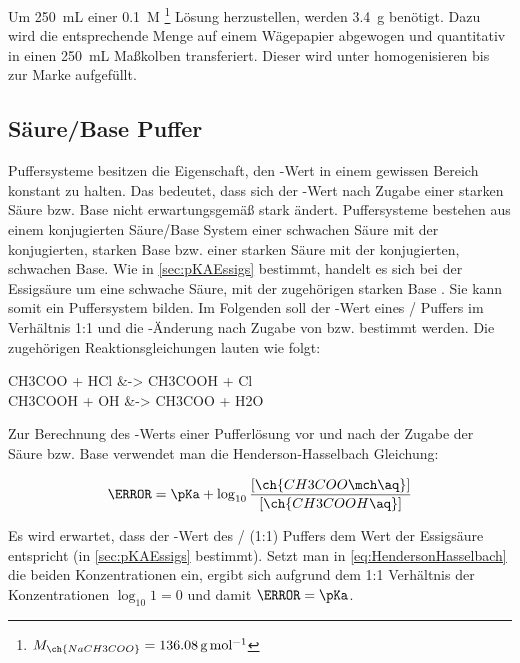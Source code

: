 \documentclass{article}
\begin{document}
         Um \SI[mode=text]{250}{\milli\liter} einer \SI[mode=text]{0.1}{M} \footnote{$M_{\ch{NaCH3COO}} = \SI[mode=text]{136.08}{\gram\per\mole}$} Lösung herzustellen, werden \SI[mode=text]{3.4}{\gram} benötigt. Dazu wird die entsprechende Menge auf einem Wägepapier abgewogen und quantitativ in einen \SI[mode=text]{250}{\milli\liter} Maßkolben transferiert. Dieser wird unter homogenisieren bis zur Marke aufgefüllt. 
    
    \pagebreak
    
    \subsection{Säure/Base Puffer} \label{sec:SauerBase}
    
      Puffersysteme besitzen die Eigenschaft, den \pH-Wert in einem gewissen Bereich konstant zu halten. Das bedeutet, dass sich der \pH-Wert nach Zugabe einer starken Säure bzw. Base nicht erwartungsgemäß stark ändert. Puffersysteme bestehen aus einem konjugierten Säure/Base System einer schwachen Säure mit der konjugierten, starken Base bzw. einer starken Säure mit der konjugierten, schwachen Base. Wie in \ref{sec:pKAEssigs} bestimmt, handelt es sich bei der Essigsäure um eine schwache Säure, mit der zugehörigen starken Base . Sie kann somit ein Puffersystem bilden. Im Folgenden soll der \pH-Wert eines / Puffers im Verhältnis 1:1 und die \pH-Änderung nach Zugabe von  bzw.  bestimmt werden. Die zugehörigen Reaktionsgleichungen lauten wie folgt:
      
      \begin{reactions}
        CH3COO\mch\aq{} + HCl\aq{} &-> CH3COOH\aq{} + Cl\mch\aq{} \label{rec:Protonenzugabe} \\
        CH3COOH\aq{} + OH\mch\aq{} &-> CH3COO\mch\aq{} + H2O 
      \end{reactions} 
      
      Zur Berechnung des \pH-Werts einer Pufferlösung vor und nach der Zugabe der Säure bzw. Base verwendet man die Henderson-Hasselbach Gleichung:
      
      \begin{equation}
        \pH = \pKa + \log _{10} \frac{[\ch{CH3COO\mch\aq}]}{[\ch{CH3COOH\aq}]} \label{eq:HendersonHasselbach}
      \end{equation}
      
      Es wird erwartet, dass der \pH-Wert des / (1:1) Puffers dem \pKa Wert der Essigsäure entspricht (in \ref{sec:pKAEssigs} bestimmt). Setzt man in \eqref{eq:HendersonHasselbach} die beiden Konzentrationen ein, ergibt sich aufgrund dem 1:1 Verhältnis der Konzentrationen $\log _{10} 1 = 0$ und damit $\pH = \pKa$. \\
      
\end{document}
